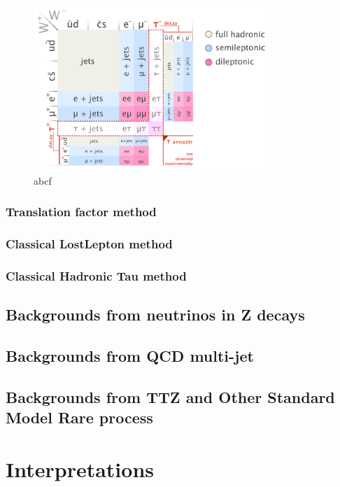 \begin{figure}[htbp]
 \begin{center}
  \includegraphics[width=0.8\textwidth]{figures/c4/c4_top_w_decaymod.png}
 \end{center}
 \caption{abcf}
 \label{fig:c4twdecaymod}
\end{figure}

\clearpage
\subsubsection{Translation factor method}
\label{sec:c4bgtf}


\clearpage
\subsubsection{Classical LostLepton method}
\label{sec:c4bgll}


\clearpage
\subsubsection{Classical Hadronic Tau method}
\label{sec:c4bghadtau}


\clearpage
\subsection{Backgrounds from neutrinos in Z decays}
\label{sec:c4bgzinv}


\clearpage
\subsection{Backgrounds from QCD multi-jet}
\label{sec:c4bgqcd}


\clearpage
\subsection{Backgrounds from TTZ and Other Standard Model Rare process}
\label{sec:c4bgttzrare}


\clearpage
\section{Interpretations}

